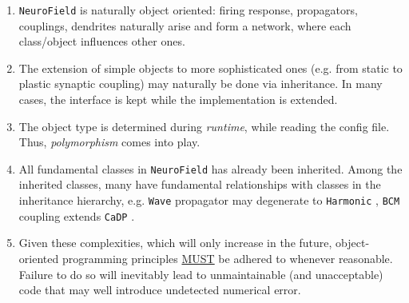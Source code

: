 \documentclass[12pt,a4paper]{article}
\newcommand{\type}[1]{{\small\small\tt #1} }
\newcommand{\NF}[0]{\type{NeuroField}}
\begin{document}
\begin{enumerate}
    \item \NF is naturally object oriented: firing response, propagators, couplings, dendrites naturally arise and form a network, where each class/object influences other ones.
    \item The extension of simple objects to more sophisticated ones (e.g. from static to plastic synaptic coupling) may naturally be done via inheritance. In many cases, the interface is kept while the implementation is extended.
    \item The object type is determined during \emph{runtime}, while reading the config file. Thus, \emph{polymorphism} comes into play.
    \item All fundamental classes in \NF has already been inherited. Among the inherited classes, many have fundamental relationships with classes in the inheritance hierarchy, e.g. \type{Wave} propagator may degenerate to \type{Harmonic}, \type{BCM} coupling extends \type{CaDP}.
    \item Given these complexities, which will only increase in the future, object-oriented programming principles \underline{MUST} be adhered to whenever reasonable. Failure to do so will inevitably lead to unmaintainable (and unacceptable) code that may well introduce undetected numerical error.
\end{enumerate}
\end{document}
